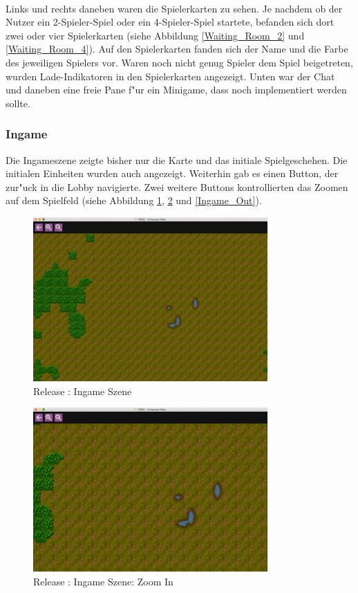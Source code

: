 \documentclass[12pt, titlepage]{scrartcl}
\newcommand{\RN}[1]{%
	\textup{\uppercase\expandafter{\romannumeral#1}}%
}
\begin{document}
			    \ \\ Links und rechts daneben waren die Spielerkarten zu sehen. Je nachdem ob der Nutzer ein 2-Spieler-Spiel oder ein 4-Spieler-Spiel startete, befanden sich dort zwei oder vier Spielerkarten (siehe Abbildung \ref{Waiting_Room_2} und \ref{Waiting_Room_4}). Auf den Spielerkarten fanden sich der Name und die Farbe des jeweiligen Spielers vor. Waren noch nicht genug Spieler dem Spiel beigetreten, wurden Lade-Indikatoren in den Spielerkarten angezeigt. Unten war der Chat und daneben eine freie Pane f"ur ein Minigame, dass noch implementiert werden sollte.
	        \subsubsection{Ingame}
	            Die Ingameszene zeigte bisher nur die Karte und das initiale Spielgeschehen. Die initialen Einheiten wurden auch angezeigt. Weiterhin gab es einen Button, der zur"uck in die Lobby navigierte. Zwei weitere Buttons kontrollierten das Zoomen auf dem Spielfeld (siehe Abbildung \ref{Ingame}, \ref{Ingame_In} und \ref{Ingame_Out}). \\
	            \begin{figure}[H] 
    				\centering
    				\includegraphics[width=0.8\textwidth]{images/old_state/ingame/Ingame.png}
    				\caption{Release \RN{2}: Ingame Szene}
    				\label{Ingame}
			    \end{figure}
			    \begin{figure}[H] 
    				\centering
    				\includegraphics[width=0.8\textwidth]{images/old_state/ingame/ZoomIn.png}
    				\caption{Release \RN{2}: Ingame Szene: Zoom In}
    				\label{Ingame_In}
			    \end{figure}
\end{document}
